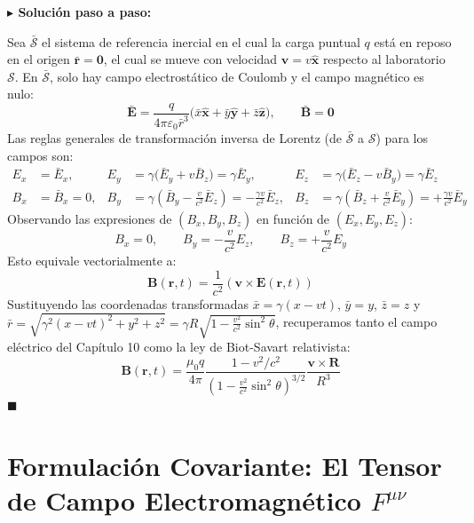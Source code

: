 \documentclass[11pt,a4paper]{book}
\newenvironment{solucion}{%
    \par\medskip\noindent\textbf{\color{blue!65!black}\Large $\blacktriangleright$ Solución paso a paso:}\par\medskip
}{%
    \hfill$\blacksquare$\par\bigskip
}
\newcommand{\xhat}{\hat{\bm{x}}}
\newcommand{\yhat}{\hat{\bm{y}}}
\newcommand{\zhat}{\hat{\bm{z}}}
\newcommand{\Evec}{\bm{E}}
\newcommand{\Bvec}{\bm{B}}
\begin{document}
\begin{solucion}
Sea $\bar{\mathcal{S}}$ el sistema de referencia inercial en el cual la carga puntual $q$ está en reposo en el origen $\bar{\bm{r}} = \bm{0}$, el cual se mueve con velocidad $\bm{v} = v\xhat$ respecto al laboratorio $\mathcal{S}$. En $\bar{\mathcal{S}}$, solo hay campo electrostático de Coulomb y el campo magnético es nulo:
\begin{equation}
    \bar{\Evec} = \frac{q}{4\pi\varepsilon_0 \bar{r}^3}\big(\bar{x}\xhat + \bar{y}\yhat + \bar{z}\zhat\big), \qquad \bar{\Bvec} = \bm{0}
\end{equation}
Las reglas generales de transformación inversa de Lorentz (de $\bar{\mathcal{S}}$ a $\mathcal{S}$) para los campos son:
\begin{align}
    E_x &= \bar{E}_x, & E_y &= \gamma\big(\bar{E}_y + v\bar{B}_z\big) = \gamma\bar{E}_y, & E_z &= \gamma\big(\bar{E}_z - v\bar{B}_y\big) = \gamma\bar{E}_z \\
    B_x &= \bar{B}_x = 0, & B_y &= \gamma\left(\bar{B}_y - \frac{v}{c^2}\bar{E}_z\right) = -\frac{\gamma v}{c^2}\bar{E}_z, & B_z &= \gamma\left(\bar{B}_z + \frac{v}{c^2}\bar{E}_y\right) = +\frac{\gamma v}{c^2}\bar{E}_y
\end{align}
Observando las expresiones de $(B_x, B_y, B_z)$ en función de $(E_x, E_y, E_z)$:
\begin{equation}
    B_x = 0, \qquad B_y = -\frac{v}{c^2} E_z, \qquad B_z = +\frac{v}{c^2} E_y
\end{equation}
Esto equivale vectorialmente a:
\begin{equation}
    \Bvec(\bm{r},t) = \frac{1}{c^2}(\bm{v} \times \Evec(\bm{r},t))
\end{equation}
Sustituyendo las coordenadas transformadas $\bar{x} = \gamma(x - vt)$, $\bar{y} = y$, $\bar{z} = z$ y $\bar{r} = \sqrt{\gamma^2(x-vt)^2 + y^2 + z^2} = \gamma R \sqrt{1 - \frac{v^2}{c^2}\sin^2\theta}$, recuperamos tanto el campo eléctrico del Capítulo 10 como la ley de Biot-Savart relativista:
\begin{equation}
    \Bvec(\bm{r},t) = \frac{\mu_0 q}{4\pi} \frac{1 - v^2/c^2}{\left(1 - \frac{v^2}{c^2}\sin^2\theta\right)^{3/2}} \frac{\bm{v} \times \bm{R}}{R^3}
\end{equation}
\end{solucion}

\section{Formulación Covariante: El Tensor de Campo Electromagnético $F^{\mu\nu}$}
\end{document}
